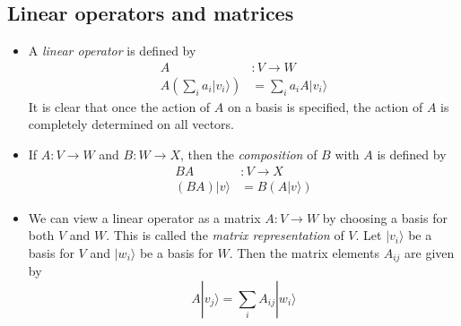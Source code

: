 \documentclass[12 pt]{article}
\begin{document}
\subsection{Linear operators and matrices}
\begin{itemize}
	\item A \emph{linear operator} is defined by
	\begin{align*}
		A&:V \to W \\
		A(\sum_i a_i|v_i\rangle)&=\sum_ia_i A|v_i\rangle
	\end{align*}
	It is clear that once the action of $A$ on a basis is specified, the action of $A$ is completely determined on all vectors.
	\item If $A:V \to W$ and $B:W \to X$, then the \emph{composition} of $B$ with $A$ is defined by
	\begin{align*}
		BA&:V \to X \\
		(BA)|v\rangle &=B(A|v\rangle)
	\end{align*}
	\item We can view a linear operator as a matrix $A:V \to W$ by choosing a basis for both $V$ and $W$. This is called the \emph{matrix representation} of $V$. Let $|v_i\rangle$ be a basis for $V$ and $|w_i\rangle$ be a basis for $W$. Then the matrix elements $A_{ij}$ are given by
	$$A|v_j\rangle = \sum_i A_{ij}|w_i\rangle$$
\end{itemize}
\end{document}

